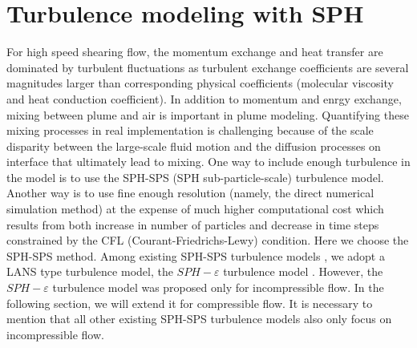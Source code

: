 \section{Turbulence modeling with SPH}
For high speed shearing flow, the momentum exchange and heat transfer are dominated by turbulent fluctuations as turbulent exchange coefficients are several magnitudes larger than corresponding physical coefficients (molecular viscosity and heat conduction coefficient). In addition to momentum and enrgy exchange, mixing between plume and air is important in plume modeling. Quantifying these mixing processes in real implementation is challenging because of the scale disparity between the large-scale fluid motion and the diffusion processes on interface that ultimately lead to mixing. 
One way to include enough turbulence in the model is to use the SPH-SPS (SPH sub-particle-scale) turbulence model. 
Another way is to use fine enough resolution (namely, the direct numerical simulation method) at the expense of much higher computational cost which results from both increase in number of particles and decrease in time steps constrained by the CFL (Courant-Friedrichs-Lewy) condition. Here we choose the SPH-SPS method. Among existing SPH-SPS turbulence models \citep{holm1999fluctuation, monaghan2002sph, violeau2007numerical, monaghan2011turbulence}, we adopt a LANS type turbulence model, the $SPH-\varepsilon$ turbulence model \citep{monaghan2011turbulence}. However, the $SPH-\varepsilon$ turbulence model was proposed only for incompressible flow. In the following section, we will extend it for compressible flow. It is necessary to mention that all other existing SPH-SPS turbulence models \citep{holm1999fluctuation, monaghan2002sph, violeau2007numerical} also only focus on incompressible flow.

% 

